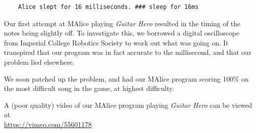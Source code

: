 \documentclass[11pt, notitlepage]{report}
\begin{document}
\begin{verbatim}
    Alice slept for 16 milliseconds. ### sleep for 16ms
\end{verbatim}

Our first attempt at MAlice playing \emph{Guitar Hero} resulted in the timing of the notes being slightly off. To investigate this, we borrowed a digital oscilloscope from Imperial College Robotics Society to work out what was going on. It transpired that our program was in fact accurate to the millisecond, and that our problem lied elsewhere.

We soon patched up the problem, and had our MAlice program scoring 100\% on the most difficult song in the game, at highest difficulty.

A (poor quality) video of our MAlice program playing \emph{Guitar Hero} can be viewed at\\
\url{https://vimeo.com/55601178}
\end{document}
